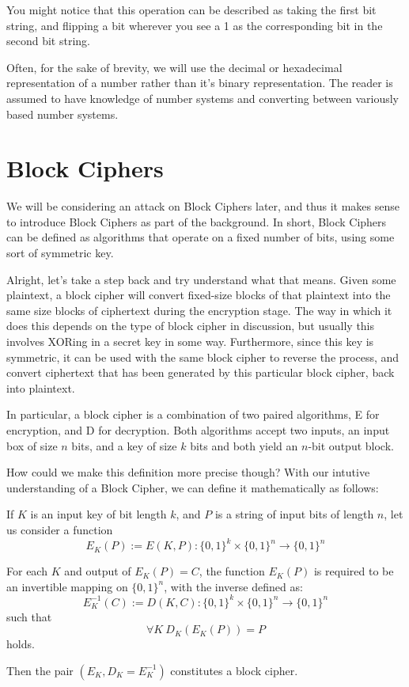 You might notice that this operation can be described as taking the first bit
string, and flipping a bit wherever you see a 1 as the corresponding bit in
the second bit string.

\begin{rem}
Often, for the sake of brevity, we will use the decimal or hexadecimal 
representation of a number rather than it's binary representation. The reader
is assumed to have knowledge of number systems and converting between
variously based number systems.
\end{rem}

\section{Block Ciphers}
We will be considering an attack on Block Ciphers later, and thus it makes sense
to introduce Block Ciphers as part of the background.  In short, Block Ciphers
can be defined as algorithms that operate on a fixed number of bits, using some
sort of symmetric key. \cite[]{handbook} 

Alright, let's take a step back and try understand what that means. Given some
plaintext, a block cipher will convert fixed-size blocks of that plaintext into
the same size blocks of ciphertext during the encryption stage. The way in which
it does this depends on the type of block cipher in discussion, but usually this
involves XORing in a secret key in some way. Furthermore, since this key is
symmetric, it can be used with the same block cipher to reverse the process, and
convert ciphertext that has been generated by this particular block cipher, back
into plaintext.

In particular, a block cipher is a combination of two paired algorithms, E for
encryption, and D for decryption. Both algorithms accept two inputs, an input box
of size $n$ bits, and a key of size $k$ bits and both yield an $n$-bit output block. 

How could we make this definition more precise though? With our intutive
understanding of a Block Cipher, we can define it mathematically as follows:

\begin{defn}
If $K$ is an input key of bit length $k$, and $P$ is a string of input bits
of length $n$, let us consider a function 
\begin{equation} \label{block-encrypt}
E_K(P) := E(K,P): \{0,1\}^k \times \{0,1\}^n \rightarrow \{0,1\}^n
\end{equation}

For each $K$ and output of $E_K(P) = C$, the function $E_K(P)$ is required to be an invertible mapping
on $\{0,1\}^n$, with the inverse defined as:
\begin{equation}\label{block-decrypt}
E_K ^{-1}(C) := D(K,C): \{0,1\}^k \times \{0,1\}^n \rightarrow \{0,1\}^n
\end{equation}
such that
\begin{equation}
\forall K\ D_K(E_K(P)) = P
\end{equation}
holds.

Then the pair $(E_K, D_K = E_K ^{-1})$ constitutes a block cipher. 
\end{defn}

